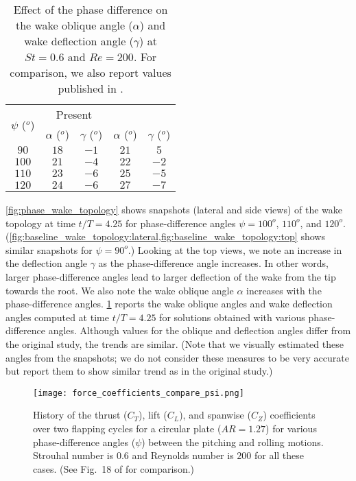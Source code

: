 \begin{table}[!h]
  \centering
  \begin{tabular}{ccccc}
    \hline\hline
    \multirow{2}{*}{$\psi$ ($^o$)} &
      \multicolumn{2}{c}{Present} &
      \multicolumn{2}{c}{\citet{li_dong_2016}} \\
    & $\alpha$ ($^o$) & $\gamma$ ($^o$) & $\alpha$ ($^o$) & $\gamma$ ($^o$) \\
    \hline
    $90$ & $18$ & $-1$ & $21$ & $5$ \\
    $100$ & $21$ & $-4$ & $22$ & $-2$ \\
    $110$ & $23$ & $-6$ & $25$ & $-5$ \\
    $120$ & $24$ & $-6$ & $27$ & $-7$ \\
    \hline\hline
  \end{tabular}
  \caption{Effect of the phase difference on the wake oblique angle ($\alpha$) and wake deflection angle ($\gamma$) at $St = 0.6$ and $Re = 200$. For comparison, we also report values published in \citet{li_dong_2016}.}
  \label{tab:phase_angles}
\end{table}

\cref{fig:phase_wake_topology} shows snapshots (lateral and side views) of the wake topology at time $t/T = 4.25$ for phase-difference angles $\psi = 100^o$, $110^o$, and $120^o$.
(\cref{fig:baseline_wake_topology:lateral,fig:baseline_wake_topology:top} shows similar snapshots for $\psi = 90^o$.)
Looking at the top views, we note an increase in the deflection angle $\gamma$ as the phase-difference angle increases.
In other words, larger phase-difference angles lead to larger deflection of the wake from the tip towards the root.
We also note the wake oblique angle $\alpha$ increases with the phase-difference angles.
\cref{tab:phase_angles} reports the wake oblique angles and wake deflection angles computed at time $t/T = 4.25$ for solutions obtained with various phase-difference angles.
Although values for the oblique and deflection angles differ from the original study, the trends are similar.
(Note that we visually estimated these angles from the snapshots; we do not consider these measures to be very accurate but report them to show similar trend as in the original study.)

\begin{figure}[!h]
  \centering
  \texttt{[image: force\_coefficients\_compare\_psi.png]}
  \caption{History of the thrust ($C_T$), lift ($C_L$), and spanwise ($C_Z$) coefficients over two flapping cycles for a circular plate ($AR = 1.27$) for various phase-difference angles ($\psi$) between the pitching and rolling motions. Strouhal number is $0.6$ and Reynolds number is $200$ for all these cases. (See Fig.~18 of \citet{li_dong_2016} for comparison.)}
  \label{fig:phase_force_coefficients}
\end{figure}

